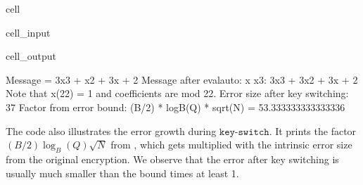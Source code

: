 \documentclass[letterpaper,10pt,english]{jupyterBook}
\begin{document}
\begin{sphinxuseclass}{cell}
\begin{sphinxVerbatimInput}
\begin{sphinxuseclass}{cell_input}
\begin{sphinxVerbatim}[commandchars=\\\{\}]
  \PYG{p}{[}\PYG{p}{]}\PYG{p}{[}\PYG{p}{]} 
  
\end{sphinxVerbatim}

\end{sphinxuseclass}\end{sphinxVerbatimInput}
\begin{sphinxVerbatimOutput}

\begin{sphinxuseclass}{cell_output}
\begin{sphinxVerbatim}[commandchars=\\\{\}]
Message = 3x\PYGZca{}3 + x\PYGZca{}2 + 3x + 2
Message after eval\PYGZhy{}auto: x \PYGZhy{}\PYGZhy{}\PYGZgt{} x\PYGZca{}3: 3x\PYGZca{}3 + 3x\PYGZca{}2 + 3x + 2
Note that x\PYGZca{}(2\PYGZca{}2) = \PYGZhy{}1 and coefficients are mod 2\PYGZca{}2.
Error size after key switching: 37
Factor from error bound: (B/2) * log\PYGZus{}B(Q) * sqrt(N) = 53.333333333333336
\end{sphinxVerbatim}

\end{sphinxuseclass}\end{sphinxVerbatimOutput}

\end{sphinxuseclass}
\sphinxAtStartPar
The code also illustrates the error growth during \(\texttt{key-switch}\).
It prints the factor \((B/2) \log_B(Q) \sqrt{N}\) from {\hyperref[\detokenize{Thesis:error-after-rlwe-x-scalar-multiply}]{}}, which gets multiplied with the intrinsic error size from the original encryption.
We observe that the error after key switching is usually much smaller than the bound times at least 1.
\end{document}
